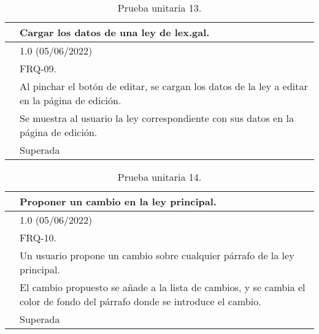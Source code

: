 \begin{table}[H]
\begin{center}
\begin{tabular}{|p{3cm}|p{10cm}|} \hline
\centering {\bf PU-13} & Cargar los datos de una ley de lex.gal.  \\ \hline\hline
\centering {\bf Versión} & 1.0 (05/06/2022) \\ \hline
\centering {\bf Dependencias} & FRQ-09. \\ \hline
\centering {\bf Descripción} &  Al pinchar el botón de editar, se cargan los datos de la ley a editar en la página de edición. \\ \hline
\centering {\bf Criterio de aceptación} & Se muestra al usuario la ley correspondiente con sus datos en la página de edición. \\ \hline
\centering {\bf Estado} & Superada \\ \hline
\end{tabular}
\caption{Prueba unitaria 13.}
\label{enlacePU13}
\end{center}
\end{table}

\begin{table}[H]
\begin{center}
\begin{tabular}{|p{3cm}|p{10cm}|} \hline
\centering {\bf PU-14} & Proponer un cambio en la ley principal.  \\ \hline\hline
\centering {\bf Versión} & 1.0 (05/06/2022) \\ \hline
\centering {\bf Dependencias} & FRQ-10. \\ \hline
\centering {\bf Descripción} &  Un usuario propone un cambio sobre cualquier párrafo de la ley principal. \\ \hline
\centering {\bf Criterio de aceptación} & El cambio propuesto se añade a la lista de cambios, y se cambia el color de fondo del párrafo donde se introduce el cambio. \\ \hline
\centering {\bf Estado} & Superada \\ \hline
\end{tabular}
\caption{Prueba unitaria 14.}
\label{enlacePU14}
\end{center}
\end{table}

